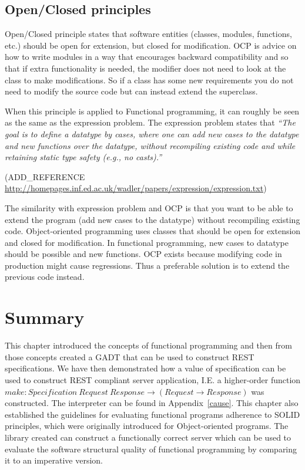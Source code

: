 \subsection{Open/Closed principles}\label{openclosed}

Open/Closed principle states that software entities (classes, modules,
functions, etc.) should be open for extension, but closed for modification. OCP
is advice on how to write modules in a way that encourages backward
compatibility and so that if extra functionality is needed, the modifier does
not need to look at the class to make modifications. So if a class has some new
requirements you do not need to modify the source code but can instead extend
the superclass.

When this principle is applied to Functional programming, it can roughly be
seen as the same as the expression problem. The expression problem states that
\textit{``The goal is to define a datatype by cases, where one can add new cases
    to the datatype and new functions over the datatype, without recompiling
existing code and while retaining static type safety (e.g., no casts).''}

(ADD\_REFERENCE \url{http://homepages.inf.ed.ac.uk/wadler/papers/expression/expression.txt})

The similarity with expression problem and OCP is that you want to be able to
extend the program (add new cases to the datatype) without recompiling existing
code.  Object-oriented programming uses classes that should be open for
extension and closed for modification. In functional programming, new cases to
datatype should be possible and new functions. OCP exists because modifying code
in production might cause regressions. Thus a preferable solution is to extend
the previous code instead.


\section{Summary}

This chapter introduced the concepts of functional programming and then from
those concepts created a GADT that can be used to construct REST specifications.
We have then demonstrated how a value of specification can be used to construct
REST compliant server application, I.E. a higher-order function $make :
Specification\ Request\ Response \rightarrow (Request\rightarrow Response)$ was
constructed. The interpreter can be found in Appendix~\ref{cause}. This chapter
also established the guidelines for evaluating functional programs adherence to
SOLID principles, which were originally introduced for Object-oriented programs.
The library created can construct a functionally correct server which can be
used to evaluate the software structural quality of functional programming by
comparing it to an imperative version. 
